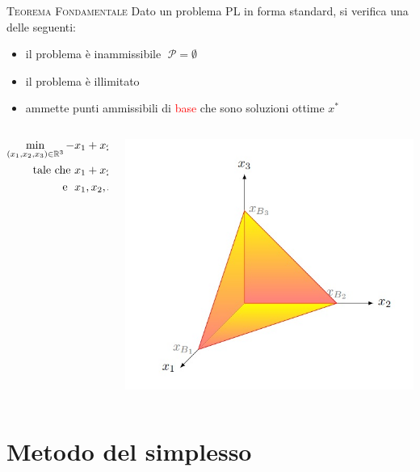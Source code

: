 \begin{frame}[t]{\textsc{\LARGE Teorema Fondamentale}}
	Dato un problema PL in forma standard, si verifica una delle seguenti: %
	\pause
\begin{itemize}
\item il problema è inammissibile $\;\mathcal{P}=\emptyset$\pause
\item il problema è illimitato\pause
\item ammette punti ammissibili di  \textcolor{red}{base} che sono soluzioni ottime $x^{*}$
\end{itemize}
\pause
\begin{columns}
\begin{column}{0.4\textwidth}
\begin{align*}
\min\limits_{(x_{1},x_{2},x_{3})\in\mathbb{R}^{3}} -&x_{1}+ x_{2}-4x_{3}\\
\text{tale che    }&x_{1}+x_{2}+x_{3}=1,\\
\text{\; e   \;} &x_{1}, x_{2}, x_{3} \geq 0
\end{align*}
\end{column}
\pause
\begin{column}{0.4\textwidth}
	\includegraphics[width=\columnwidth]{Feas.jpg}
\end{column}
\end{columns}
\end{frame}



\section{Metodo del simplesso}

